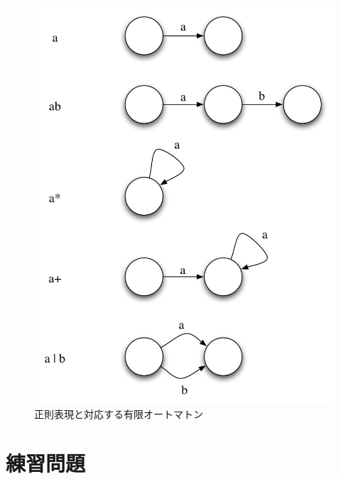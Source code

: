 \begin{figure}
 \begin{center}
  \includegraphics[width=12cm]{figure/regexp_and_fa.pdf}
 \end{center}
 \caption{正則表現と対応する有限オートマトン}
 \label{125936_30Mar06}
\end{figure}

\section{練習問題}

